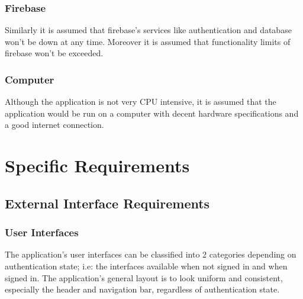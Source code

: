 \documentclass[12 pt, a4paper]{report}
\begin{document}
	\subsection{Firebase}
	Similarly it is assumed that firebase's services like authentication and database won't be down at any time. Moreover it is assumed that functionality limits of firebase won't be exceeded.
	
	\subsection{Computer}
	Although the application is not very CPU intensive, it is assumed that the application would be run on a computer with decent hardware specifications and a good internet connection.
	

	\chapter {Specific Requirements}
	\section {External Interface Requirements}
	\subsection {User Interfaces}

	The application's user interfaces can be classified into 2 categories depending on authentication state; i.e: the interfaces available when not signed in and when signed in. The application's general layout is to look uniform and consistent, especially the header and navigation bar, regardless of authentication state.
	
\end{document}
